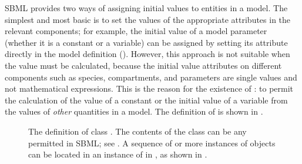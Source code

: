 SBML \thisLV provides two ways of assigning initial values to
entities in a model.  The simplest and most basic is to set the
values of the appropriate attributes in the relevant
components; for example, the initial value of a model parameter
(whether it is a constant or a variable) can be assigned by
setting its  attribute directly in the model definition
().  However, this approach is not
suitable when the value must be calculated, because the initial
value attributes on different components such as species,
compartments, and parameters are single values and not
mathematical expressions.  This is the reason for the existence
of \InitialAssignment: to permit the calculation of the value of a
constant or the initial value of a variable from the values of
\emph{other} quantities in a model.  The definition of
\InitialAssignment is shown in .

\begin{figure}[htb]
  \vspace*{0.5ex}
  \centering
  \small
  \vspace*{0.5ex}
  \caption{The definition of class \InitialAssignment.  The
    contents of the \Math class can be any \mathml
    permitted in SBML; see
    \protect{}.  A
    sequence of  or more instances of \InitialAssignment
    objects can be located in an instance of
    \ListOfInitialAssignments in \Model, as shown in
    \protect{}.}
  \label{fig:initialAssignment}
\end{figure}

